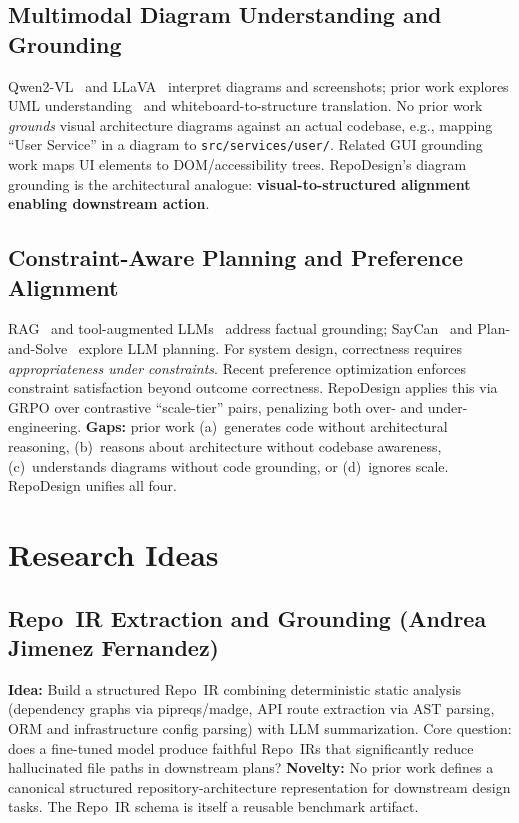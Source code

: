 \documentclass{article}
\begin{document}
\subsection{Multimodal Diagram Understanding and Grounding}
Qwen2-VL~\cite{qwenvl} and LLaVA~\cite{llava} interpret diagrams and screenshots; prior work explores UML understanding~\cite{kimura} and whiteboard-to-structure translation. No prior work \emph{grounds} visual architecture diagrams against an actual codebase, e.g., mapping ``User Service'' in a diagram to \texttt{src/services/user/}. Related GUI grounding work maps UI elements to DOM/accessibility trees. RepoDesign's diagram grounding is the architectural analogue: \textbf{visual-to-structured alignment enabling downstream action}.

\subsection{Constraint-Aware Planning and Preference Alignment}
RAG~\cite{rag} and tool-augmented LLMs~\cite{toolformer} address factual grounding; SayCan~\cite{saycan} and Plan-and-Solve~\cite{plansolve} explore LLM planning. For system design, correctness requires \emph{appropriateness under constraints}. Recent preference optimization enforces constraint satisfaction beyond outcome correctness. RepoDesign applies this via GRPO over contrastive ``scale-tier'' pairs, penalizing both over- and under-engineering. \textbf{Gaps:} prior work (a)~generates code without architectural reasoning, (b)~reasons about architecture without codebase awareness, (c)~understands diagrams without code grounding, or (d)~ignores scale. RepoDesign unifies all four.

\section{Research Ideas}

\subsection{Repo~IR Extraction and Grounding \textnormal{(Andrea Jimenez Fernandez)}}
\textbf{Idea:} Build a structured Repo~IR combining deterministic static analysis (dependency graphs via pipreqs/madge, API route extraction via AST parsing, ORM and infrastructure config parsing) with LLM summarization. Core question: does a fine-tuned model produce faithful Repo~IRs that significantly reduce hallucinated file paths in downstream plans?
\textbf{Novelty:} No prior work defines a canonical structured repository-architecture representation for downstream design tasks. The Repo~IR schema is itself a reusable benchmark artifact.
\end{document}

